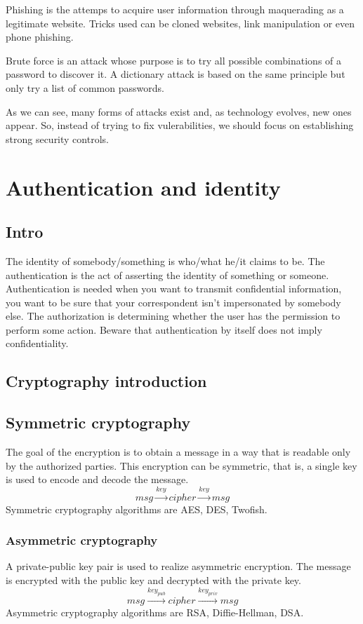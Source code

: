 Phishing is the attemps to acquire user information through maquerading as a
legitimate website. Tricks used can be cloned websites, link manipulation or
even phone phishing.

Brute force is an attack whose purpose is to try all possible combinations of
a password to discover it. A dictionary attack is based on the same principle
but only try a list of common passwords.

As we can see, many forms of attacks exist and, as technology evolves, new
ones appear. So, instead of trying to fix vulerabilities, we should focus on
establishing strong security controls.

\section{Authentication and identity}

\subsection{Intro}
The identity of somebody/something is who/what he/it claims to be.
The authentication is the act of asserting the identity of something or someone.
Authentication is needed when you want to transmit confidential
information, you want to be sure that your correspondent isn't
impersonated by somebody else.
The authorization is determining whether the user has the permission to perform some action.
Beware that authentication by itself does not imply confidentiality.
\subsection{Cryptography introduction}
\subsection{Symmetric cryptography}
The goal of the encryption is to obtain a message in a way that is readable only by the authorized parties.
This encryption can be symmetric, that is, a single key is used to encode and decode the message. 
\[ msg \xrightarrow{key} cipher \xrightarrow{key} msg \]
Symmetric cryptography algorithms are AES, DES, Twofish.
\subsubsection{Asymmetric cryptography}
A private-public key pair is used to realize asymmetric encryption. The message is encrypted with the public key and decrypted with the private key. 
\[ msg \xrightarrow{key_{pub}} cipher \xrightarrow{key_{priv}} msg \]
Asymmetric cryptography algorithms are RSA, Diffie-Hellman, DSA.
